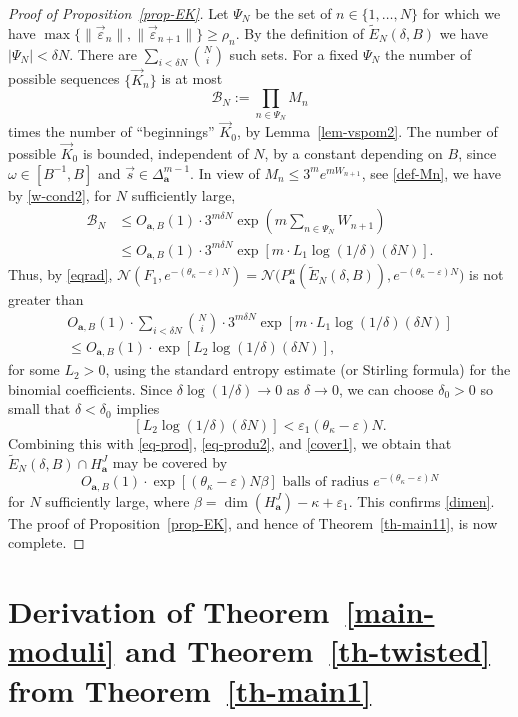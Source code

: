 \documentclass[11pt]{article}
\numberwithin{equation}{section}\newcommand{\Relation}[2][]{}\newtheorem*{prop*}{Proposition}
\let\mathcal\mathscr
\let\epsilon\varepsilon
\theoremstyle{plain}
\theoremstyle{definition}
\let\wt\widetilde
\newcommand\bom{{\boldsymbol a}}\let\ba\bom
\let\eps\varepsilon
\let\om\omega
\newcommand\Ns{{\mathscr N}}
\newcommand\Bk{\mathcal{B}}
\begin{document}
\begin{proof}[Proof of Proposition~\ref{prop-EK}]
Let $\Psi_N$ be the set of $n\in \{1,\ldots,N\}$ for which
we have $\max\{\|\vec\eps_{n}\|,\|\vec\eps_{{n+1}}\|\}\ge \rho_n$.
By the definition of $\wt E_N(\delta,B)$ we have $|\Psi_N| <\delta N$.
There are $\sum_{i< \delta N} \binom{N}{ i}$ such sets. For a fixed $\Psi_N$ the number of possible sequences $\{\vec K_{n}\}$ is at most
\[
\Bk_N:= \prod_{n\in \Psi_N} M_n
\]
times the number of ``beginnings'' $\vec K_{0}$, by Lemma~\ref{lem-vspom2}.
The number of possible $\vec K_{0}$ is bounded, independent of $N$, by a constant depending on $B$, since $\om\in [B^{-1},B]$ and $\vec s\in \Delta_\bom^{m-1}$.
In view of $M_n \le 3^m e^{mW_{n+1}}$, see \eqref{def-Mn}, we have by \eqref{w-cond2}, for $N$ sufficiently large,
\begin{align*}
\Bk_N &\le O_{\bom,B}(1) \cdot 3^{m\delta N} \exp(m \textstyle\sum_{n\in \Psi_N}W_{n+1})\\
&\le O_{\bom,B}(1) \cdot 3^{m\delta N} \exp[m\cdot L_1\log(1/\delta)(\delta N)].
\end{align*}
Thus, by \eqref{eqrad},
$\Ns(F_1, e^{-(\theta_\kappa-\epsilon)N})\!=\!\Ns\bigl(P_\bom^u(\wt E_N(\delta,B)),e^{-(\theta_\kappa-\epsilon)N}\bigr)$ is not greater than
\begin{multline}
\label{lasta1}
O_{\bom,B}(1)\cdot \sum_{i<\delta N} \binom{N}{i} \cdot 3^{m\delta N} \exp[m\cdot L_1\log(1/\delta)(\delta N)]\\[-8pt]
\le O_{\bom,B}(1)\cdot \exp[L_2 \log(1/\delta)(\delta N)],
\end{multline}
for some $L_2>0$, using the standard entropy estimate (or Stirling formula) for the binomial coefficients. Since $\delta\log(1/\delta)\to 0$ as $\delta\to 0$, we can choose $\delta_0>0$ so small
that $\delta< \delta_0$ implies
\[
\left[L_2\log(1/\delta)(\delta N)\right] < \epsilon_1 (\theta_\kappa-\epsilon)N.
\]
Combining this with \eqref{eq-prod}, \eqref{eq-produ2}, and \eqref{cover1}, we obtain that $\wt E_N(\delta,B)\cap H_\bom^J$ may be covered by
\[
O_{\bom,B}(1)\cdot\exp\left[(\theta_\kappa-\eps)N\beta\right] \text{ balls of radius } e^{-(\theta_\kappa-\epsilon)N}
\]
for $N$ sufficiently large, where $\beta = \dim(H_\bom^J) - \kappa + \epsilon_1$. This confirms \eqref{dimen}.
The proof of Proposition~\ref{prop-EK}, and hence of
Theorem~\ref{th-main11}, is now complete.
\end{proof}

\section{Derivation of Theorem~\ref{main-moduli} and Theorem~\ref{th-twisted} from Theorem~\ref{th-main1} } \label{sec-deriv}
\end{document}
